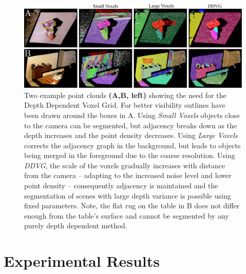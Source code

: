 \begin{figure}[!ht]
  \centering
  \includegraphics[width = \linewidth]{figures/CVPR2014/transform_results_v2}
\caption[Depth Adaptive Transform]{Two example point clouds \textbf{(A,B, left)} showing the need for the Depth Dependent Voxel Grid. For better visibility outlines have been drawn around the boxes in A. Using \textit{Small Voxels} objects close to the camera can be segmented, but adjacency breaks down as the depth increases and the point density decreases. Using \textit{Large Voxels} corrects the adjacency graph in the background, but leads to objects being merged in the foreground due to the coarse resolution. Using \textit{DDVG}, the scale of the voxels gradually increases with distance from the camera -- adapting to the increased noise level and lower point density -- consequently adjacency is maintained and the segmentation of scenes with large depth variance is possible using fixed parameters. Note, the flat rug on the table in B does not differ enough from the table's surface and cannot be segmented by any purely depth dependent method.}
\label{fig:quantization_transform}
\end{figure}


\section{Experimental Results}

